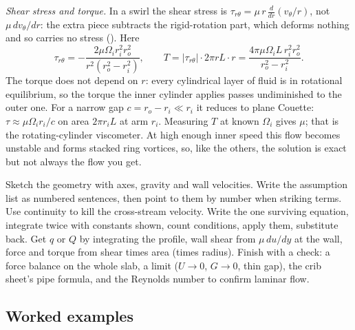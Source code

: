\emph{Shear stress and torque.} In a swirl the shear stress is $\tau_{r\theta} = \mu\,r\,\frac{d}{dr}(v_\theta/r)$, not $\mu\,dv_\theta/dr$: the extra piece subtracts the rigid-rotation part, which deforms nothing and so carries no stress (). Here
\[
\tau_{r\theta} = -\frac{2\mu\Omega_i r_i^2 r_o^2}{r^2(r_o^2 - r_i^2)}, \qquad
T = |\tau_{r\theta}|\cdot 2\pi rL\cdot r = \frac{4\pi\mu\Omega_i L\,r_i^2r_o^2}{r_o^2 - r_i^2}.
\]
The torque does not depend on $r$: every cylindrical layer of fluid is in rotational equilibrium, so the torque the inner cylinder applies passes undiminished to the outer one. For a narrow gap $c = r_o - r_i \ll r_i$ it reduces to plane Couette: $\tau \approx \mu\Omega_i r_i/c$ on area $2\pi r_iL$ at arm $r_i$. Measuring $T$ at known $\Omega_i$ gives $\mu$; that is the rotating-cylinder viscometer. At high enough inner speed this flow becomes unstable and forms stacked ring vortices, so, like the others, the solution is exact but not always the flow you get.

\begin{firstmoves}
Sketch the geometry with axes, gravity and wall velocities. Write the assumption list as numbered sentences, then point to them by number when striking terms. Use continuity to kill the cross-stream velocity. Write the one surviving equation, integrate twice with constants shown, count conditions, apply them, substitute back. Get $q$ or $Q$ by integrating the profile, wall shear from $\mu\,du/dy$ at the wall, force and torque from shear times area (times radius). Finish with a check: a force balance on the whole slab, a limit ($U \to 0$, $G \to 0$, thin gap), the crib sheet's pipe formula, and the Reynolds number to confirm laminar flow.
\end{firstmoves}

\subsection*{Worked examples}

